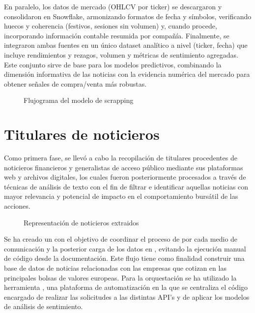 \documentclass[letterpaper,10pt,spanish]{sphinxmanual}
\begin{document}
\sphinxAtStartPar
En paralelo, los datos de mercado (OHLCV por ticker) se descargaron y consolidaron en Snowflake, armonizando formatos de fecha y símbolos, verificando huecos y coherencia (festivos, sesiones sin volumen) y, cuando procede, incorporando información contable resumida por compañía. Finalmente, se integraron ambas fuentes en un único dataset analítico a nivel (ticker, fecha) que incluye rendimientos y rezagos, volumen y métricas de sentimiento agregadas. Este conjunto sirve de base para los modelos predictivos, combinando la dimensión informativa de las noticias con la evidencia numérica del mercado para obtener señales de compra/venta más robustas.

\begin{figure}[htbp]
\centering
\capstart

\noindent{}
\caption{ Flujograma del modelo de scrapping}\label{\detokenize{DatosPreparacion:id1}}\end{figure}


\section{Titulares de noticieros}
\label{\detokenize{DatosPreparacion:titulares-de-noticieros}}
\sphinxAtStartPar
Como primera fase, se llevó a cabo la recopilación de titulares procedentes de noticieros financieros y generalistas de acceso público mediante sus plataformas web y archivos digitales, los cuales fueron posteriormente procesados a través de técnicas de análisis de texto con el fin de filtrar e identificar aquellas noticias con mayor relevancia y potencial de impacto en el comportamiento bursátil de las acciones.

\begin{figure}[htbp]
\centering
\capstart

\noindent{}
\caption{ Representación de noticieros extraidos}\label{\detokenize{DatosPreparacion:id2}}\end{figure}

\sphinxAtStartPar
Se ha creado un  con el objetivo de coordinar el proceso de  por cada medio de comunicación y la posterior carga de los datos en , evitando la ejecución manual de código desde la documentación. Este flujo tiene como finalidad construir una base de datos de noticias relacionadas con las empresas que cotizan en las principales bolsas de valores europeas.   Para la orquestación se ha utilizado la herramienta , una plataforma de automatización en la que se centraliza el código encargado de realizar las solicitudes a las distintas API’s y de aplicar los modelos de análisis de sentimiento.
\end{document}
